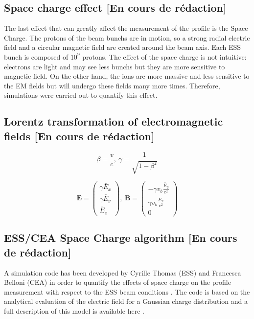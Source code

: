 \begin{refsection}
  \section{Space charge effect [En cours de rédaction]}
  The last effect that can greatly affect the measurement of the profile is the Space Charge. The protons of the beam bunchs are in motion, so a strong radial electric field and a circular magnetic field are created around the beam axis. Each ESS bunch is composed of $10^{9}$ protons. The effect of the space charge is not intuitive: electrons are light and may see less bunchs but they are more sensitive to magnetic field. On the other hand, the ions are more massive and less sensitive to the EM fields but will undergo these fields many more times. Therefore, simulations were carried out to quantify this effect.

  \subsection{Lorentz transformation of electromagnetic fields [En cours de rédaction]}

  \begin{equation}
    \beta = \frac{v}{c}
    ,\
    \gamma = \frac{1}{\sqrt{1 - \beta^{2}}}
  \end{equation}

  \begin{equation}
    \boldsymbol{E} =
    \begin{pmatrix}
      \gamma \bar{E}_{x} \\
      \gamma \bar{E}_{y} \\
      \bar{E}_{z}
    \end{pmatrix}
    ,\
    \boldsymbol{B} =
    \begin{pmatrix}
      -\gamma v_{b} \frac{\bar{E}_y}{c^{2}} \\
      \gamma v_{b} \frac{\bar{E}_x}{c^{2}}  \\
      0
    \end{pmatrix}
  \end{equation}
  \subsection{ESS/CEA Space Charge algorithm [En cours de rédaction]}
  A simulation code has been developed by Cyrille Thomas (ESS) and Francesca Belloni (CEA) in order to quantify the effects of space charge on the profile measurement with respect to the ESS beam conditions \cite{Thomas-2016-1,Belloni2018}. The code is based on the analytical evaluation of the electric field for a Gaussian charge distribution and a full description of this model is available here \cite{Wanzenberg2010}.

\end{refsection}
